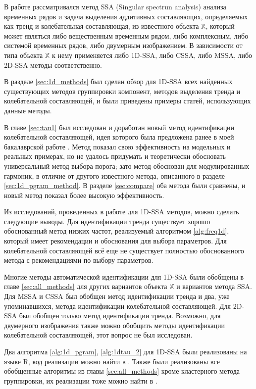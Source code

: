 \documentclass[specialist,
               substylefile = spbu.rtx,
               subf,href,colorlinks=true, 12pt]{disser}
\begin{document}
\conclusion
В работе рассматривался метод SSA (Singular spectrun analysis) анализа временных рядов и задача выделения аддитивных составляющих, определяемых как тренд и колебательная составляющая, из известного объекта $\mathbb{X}$, который может являться либо вещественным временным рядом, либо комплексным, либо системой временных рядов, либо двумерным изображением. В зависимости от типа объекта $\mathbb{X}$ к нему применяется либо 1D-SSA, либо CSSA, либо MSSA, либо 2D-SSA методы соответственно.

В разделе \ref{sec:1d_methods} был сделан обзор для 1D-SSA всех найденных существующих методов группировки компонент, методов выделения тренда и колебательной составляющей, и были приведены примеры статей, использующих данные методы. 

В главе \ref{sec:tau1} был исследован и доработан новый метод идентификации колебательной составляющей, идея которого была предложена ранее в моей бакалаврской работе \cite{Zhornikova2016}. Метод показал свою эффективность на модельных и реальных примерах, но не удалось придумать и теоретически обосновать универсальный метод выбора порога; зато метод обоснован для модулированных гармоник, в отличие от другого известного метода, описанного в разделе \ref{sec:1d_pgram_method}. В разделе \ref{sec:compare} оба метода были сравнены, и новый метод показал более высокую эффективность.

Из исследований, проведенных в работе для 1D-SSA методов, можно сделать следующие выводы. Для идентификации тренда существует хорошо обоснованный метод низких частот, реализуемый алгоритмом \ref{alg:freq1d}, который имеет рекомендации и обоснования для выбора параметров. Для колебательной составляющей всё еще не существует полностью обоснованного метода с рекомендациями по выбору параметров.

Многие методы автоматической идентификации для 1D-SSA были обобщены в главе \ref{sec:all_methods} для других вариантов объекта $\mathbb{X}$ и вариантов метода SSA. Для MSSA и CSSA был обобщен метод идентификации тренда и два, уже упоминавшихся, метода идентификации колебательной составляющей. Для 2D-SSA был обобщен только метод идентификации тренда. 
Возможно, для двумерного изображения также можно обобщить методы идентификации колебательной составляющей, этот вопрос не был исследован.

Два алгоритма \ref{alg:1d_pgram}, \ref{alg:1dtau_2} для 1D-SSA были реализованы на языке R, код реализации можно найти в \cite{polina_zhornikova_2018_1252476}. 
Также были реализованы все обобщенные алгоритмы из главы \ref{sec:all_methods} кроме кластерного метода группировки, их реализации тоже можно найти в \cite{polina_zhornikova_2018_1252476}.



\end{document}
